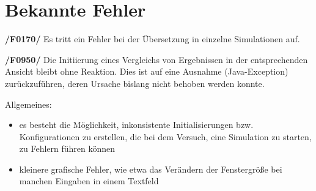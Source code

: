 \section{Bekannte Fehler}

\textbf{/F0170/}
Es tritt ein Fehler bei der Übersetzung in einzelne Simulationen auf.

\textbf{/F0950/}
Die Initiierung eines Vergleichs von Ergebnissen in der entsprechenden Ansicht bleibt ohne Reaktion. Dies ist auf eine Ausnahme (Java-Exception) zurückzuführen, deren Ursache bislang nicht behoben werden konnte.

Allgemeines:
\begin{itemize}
\item es besteht die Möglichkeit, inkonsistente Initialisierungen bzw. Konfigurationen zu erstellen, die bei dem Versuch, eine Simulation zu starten, zu Fehlern führen können

\item kleinere grafische Fehler, wie etwa das Verändern der Fenstergröße bei manchen Eingaben in einem Textfeld
\end{itemize}